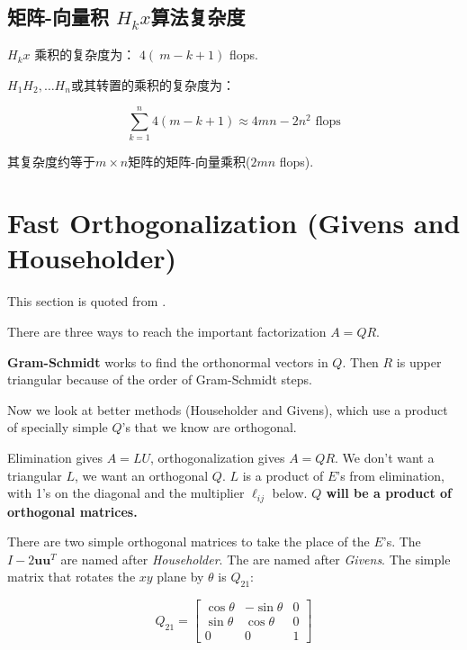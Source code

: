 \subsection{矩阵-向量积 $ H_{k} x $算法复杂度}

$ H_{k} x $ 乘积的复杂度为： $ 4( {~m}- {k}+1) $ flops.

$H_{1} H_{2}, \ldots H_{n} $或其转置的乘积的复杂度为： 

\begin{equation} \sum_{k=1}^{n} 4(m-k+1) \approx 4 m n-2 n^{2}  \text{ flops}\end{equation}

其复杂度约等于$m \times n$矩阵的矩阵-向量乘积($2mn$ flops). 


\section{Fast Orthogonalization (Givens and Householder)}

\begin{remark}
    This section is quoted from \cite{Strang1993IntroductionTL}.
\end{remark}

There are three ways to reach the important factorization $A=Q R$. 

\textbf{Gram-Schmidt} works to find the orthonormal vectors in $Q .$ Then $R$ is upper triangular because of the order of Gram-Schmidt steps. 

Now we look at better methods (Householder and Givens), which use a product of specially simple $Q$'s that we know are orthogonal.

Elimination gives $A=L U$, orthogonalization gives $A=Q R$. We don't want a triangular $L$, we want an orthogonal $Q$. $L$ is a product of $E$'s from elimination, with 1's on the diagonal and the multiplier $\ell_{i j}$ below. \textbf{$Q$ will be a product of orthogonal matrices.}

There are two simple orthogonal matrices to take the place of the $E$'s. The  $I-2 \boldsymbol{u} \boldsymbol{u}^{ {T}}$ are named after \textit{Householder}. The  are named after \textit{Givens}. The simple matrix that rotates the $x y$ plane by $\theta$ is $Q_{21}$:  

\begin{definition}
    \begin{equation}Q_{21}=\left[\begin{array}{crc}
        \cos \theta & -\sin \theta & 0 \\
        \sin \theta & \cos \theta & 0 \\
        0 & 0 & 1
        \end{array}\right]\end{equation}
\end{definition}

